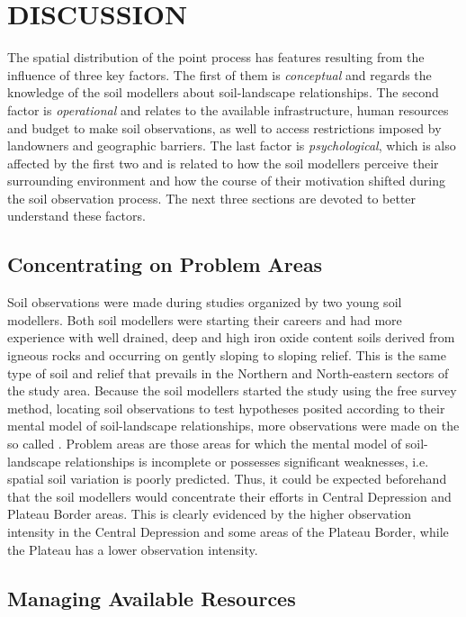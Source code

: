 \section{DISCUSSION}

The spatial distribution of the point process has features resulting from the influence of three key factors. 
The first of them is \textit{conceptual} and regards the knowledge of the soil modellers about soil-landscape 
relationships. The second factor is \textit{operational} and relates to the available infrastructure, human 
resources and budget to make soil observations, as well to access restrictions imposed by landowners and 
geographic barriers. The last factor is \textit{psychological}, which is also affected by the first two and is 
related to how the soil modellers perceive their surrounding environment and how the course of their 
motivation shifted during the soil observation process. The next three sections are devoted to better 
understand these factors.

\subsection{Concentrating on Problem Areas}
\label{subsec:chap07-conceptual}

Soil observations were made during studies organized by two young soil modellers. Both soil modellers were 
starting their careers and had more experience with well drained, deep and high iron oxide content soils 
derived from igneous rocks and occurring on gently sloping to sloping relief. This is the same type of soil and
relief that prevails in the Northern and North-eastern sectors of the study area. Because the soil 
modellers started the study using the free survey method, locating soil observations to test hypotheses 
posited according to their mental model of soil-landscape relationships, more observations were made on the so 
called  \cite{Rossiter2000}. Problem areas are those areas for which the mental model of 
soil-landscape relationships is incomplete or possesses significant weaknesses, i.e. spatial soil variation is 
poorly predicted. Thus, it could be expected beforehand that the soil modellers would concentrate their 
efforts in Central Depression and Plateau Border areas. This is clearly evidenced by the higher observation 
intensity in the Central Depression and some areas of the Plateau Border, while the Plateau has a lower 
observation intensity.

\subsection{Managing Available Resources}

